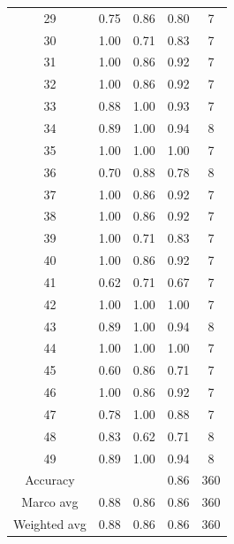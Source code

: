 \documentclass{article}
\begin{document}
\begin{sloppy}
\begin{table}[ht]
\begin{tabular}{|c|c|c|c|c|}
  29 & 0.75 & 0.86 & 0.80 & 7 \\
  30 & 1.00 & 0.71 & 0.83 & 7 \\
  31 & 1.00 & 0.86 & 0.92 & 7 \\
  32 & 1.00 & 0.86 & 0.92 & 7 \\
  33 & 0.88 & 1.00 & 0.93 & 7 \\
  34 & 0.89 & 1.00 & 0.94 & 8 \\
  35 & 1.00 & 1.00 & 1.00 & 7 \\
  36 & 0.70 & 0.88 & 0.78 & 8 \\
  37 & 1.00 & 0.86 & 0.92 & 7 \\
  38 & 1.00 & 0.86 & 0.92 & 7 \\
  39 & 1.00 & 0.71 & 0.83 & 7 \\
  40 & 1.00 & 0.86 & 0.92 & 7 \\
  41 & 0.62 & 0.71 & 0.67 & 7 \\
  42 & 1.00 & 1.00 & 1.00 & 7 \\
  43 & 0.89 & 1.00 & 0.94 & 8 \\
  44 & 1.00 & 1.00 & 1.00 & 7 \\
  45 & 0.60 & 0.86 & 0.71 & 7 \\
  46 & 1.00 & 0.86 & 0.92 & 7 \\
  47 & 0.78 & 1.00 & 0.88 & 7 \\
  48 & 0.83 & 0.62 & 0.71 & 8 \\
  49 & 0.89 & 1.00 & 0.94 & 8 \\
  \hline
  Accuracy &  &  & 0.86 & 360 \\
  Marco avg & 0.88 & 0.86 & 0.86 & 360 \\
  Weighted avg & 0.88 & 0.86 & 0.86 & 360 \\
  \hline
  \end{tabular}
\end{table}


\end{sloppy}
\end{document}
